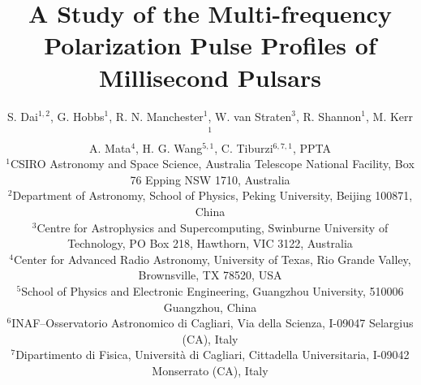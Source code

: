 \documentclass[useAMS,usenatbib]{mn2e}
\begin{document}
\title[A Study of the Multi-frequency Polarization Pulse Profiles of Millisecond Pulsars]{A Study of the Multi-frequency Polarization Pulse Profiles of Millisecond Pulsars}

\author[S. Dai et al.]{S. Dai$^{1,2}$, G. Hobbs$^1$, R. N. Manchester$^1$, W. van Straten$^3$, R. Shannon$^1$, M. Kerr$^1$\\
\newauthor A. Mata$^4$, H. G. Wang$^{5,1}$, C. Tiburzi$^{6,7,1}$, PPTA\\
$^1$CSIRO Astronomy and Space Science, Australia Telescope National Facility, Box 76 Epping NSW 1710, Australia\\
$^2$Department of Astronomy, School of Physics, Peking University, Beijing 100871, China\\
$^3$Centre for Astrophysics and Supercomputing, Swinburne University of Technology, PO Box 218, Hawthorn, VIC 3122, Australia\\
$^4$Center for Advanced Radio Astronomy, University of Texas, Rio Grande Valley,
Brownsville, TX 78520, USA\\
$^5$School of Physics and Electronic Engineering, Guangzhou University, 510006 Guangzhou, China\\
$^6$INAF–Osservatorio Astronomico di Cagliari, Via della Scienza, I-09047 Selargius (CA), Italy\\
$^7$Dipartimento di Fisica, Universit\`a di Cagliari, Cittadella Universitaria, I-09042 Monserrato (CA), Italy\\
}

\maketitle
\end{document}
